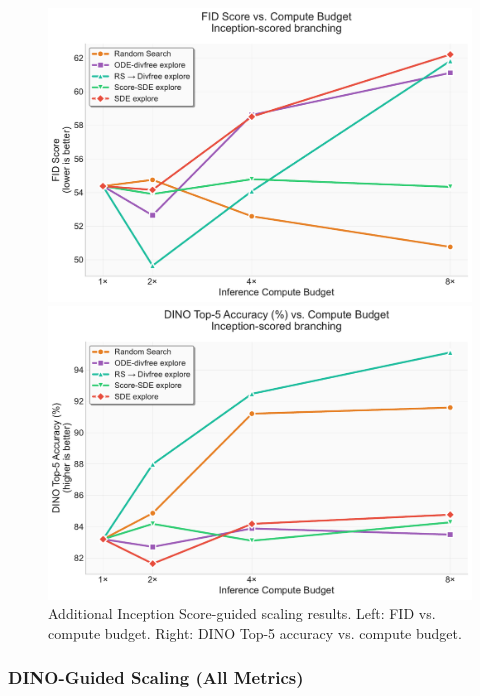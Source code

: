 \documentclass{article}
\begin{document}
\begin{figure}[H]
  \centering
  \begin{minipage}{0.48\textwidth}
    \centering
    \includegraphics[width=\textwidth]{figures/scaling_inception_fid.pdf}
  \end{minipage}
  \hfill
  \begin{minipage}{0.48\textwidth}
    \centering
    \includegraphics[width=\textwidth]{figures/scaling_inception_top5.pdf}
  \end{minipage}
  \caption{Additional Inception Score-guided scaling results. Left: FID vs. compute budget. Right: DINO Top-5 accuracy vs. compute budget.}
  \label{fig:inception-scaling-complete}
\end{figure}

\subsubsection{DINO-Guided Scaling (All Metrics)}
\end{document}
